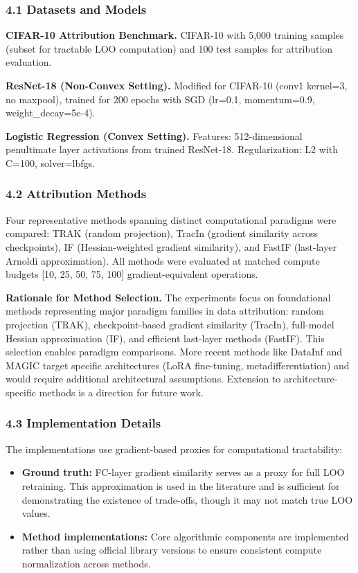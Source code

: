 
\subsubsection{4.1 Datasets and Models}

\textbf{CIFAR-10 Attribution Benchmark.} CIFAR-10 with 5,000 training samples (subset for tractable LOO computation) and 100 test samples for attribution evaluation.

\textbf{ResNet-18 (Non-Convex Setting).} Modified for CIFAR-10 (conv1 kernel=3, no maxpool), trained for 200 epochs with SGD (lr=0.1, momentum=0.9, weight\_decay=5e-4).

\textbf{Logistic Regression (Convex Setting).} Features: 512-dimensional penultimate layer activations from trained ResNet-18. Regularization: L2 with C=100, solver=lbfgs.

\subsubsection{4.2 Attribution Methods}

Four representative methods spanning distinct computational paradigms were compared: TRAK (random projection), TracIn (gradient similarity across checkpoints), IF (Hessian-weighted gradient similarity), and FastIF (last-layer Arnoldi approximation). All methods were evaluated at matched compute budgets [10, 25, 50, 75, 100] gradient-equivalent operations.

\textbf{Rationale for Method Selection.} The experiments focus on foundational methods representing major paradigm families in data attribution: random projection (TRAK), checkpoint-based gradient similarity (TracIn), full-model Hessian approximation (IF), and efficient last-layer methods (FastIF). This selection enables paradigm comparisons. More recent methods like DataInf and MAGIC target specific architectures (LoRA fine-tuning, metadifferentiation) and would require additional architectural assumptions. Extension to architecture-specific methods is a direction for future work.

\subsubsection{4.3 Implementation Details}

The implementations use gradient-based proxies for computational tractability:

\begin{itemize}
\item \textbf{Ground truth:} FC-layer gradient similarity serves as a proxy for full LOO retraining. This approximation is used in the literature and is sufficient for demonstrating the existence of trade-offs, though it may not match true LOO values.
\item \textbf{Method implementations:} Core algorithmic components are implemented rather than using official library versions to ensure consistent compute normalization across methods.
\end{itemize}

